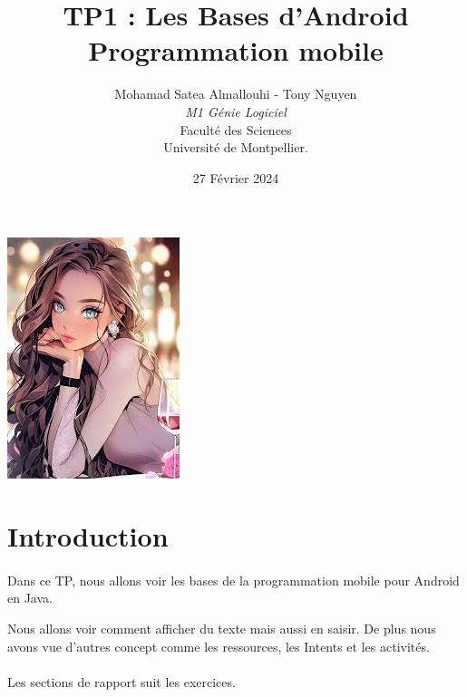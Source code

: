 \documentclass[a4paper]{article}
\title{  TP1 : Les Bases d'Android\\         %
  Programmation mobile}
\author{Mohamad Satea Almallouhi - Tony Nguyen\\
  \emph{M1 Génie Logiciel}\\
  Faculté des Sciences\\
Université de Montpellier.}
\date{27 Février 2024}
\begin{document}
\maketitle                    %

\begin{center}
  \includegraphics[scale=1]{cuteGirl.jpeg}
\end{center}



\newpage
\tableofcontents
\section*{Introduction}
  \paragraph{}
    Dans ce TP, nous allons voir les bases de la programmation mobile pour Android en Java.
    
    Nous allons voir comment afficher du texte mais aussi en saisir. De plus nous avons vue d'autres concept comme les ressources, les Intents et les activités.
  \paragraph{}
    Les sections de rapport suit les exercices.
\newpage
\end{document}
